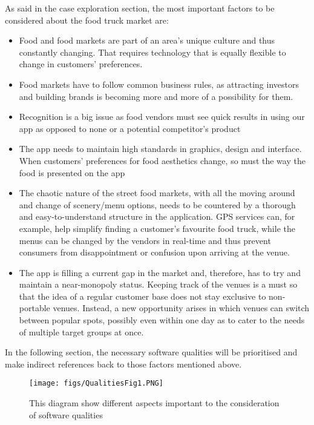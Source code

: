 As said in the case exploration section, the most important factors to be considered about the food truck market are:

\begin{itemize}

\item Food and food markets are part of an area’s unique culture and thus constantly changing. That requires technology that is equally flexible to change in customers’ preferences.

\item Food markets have to follow common business rules, as attracting investors and building brands is becoming more and more of a possibility for them.

\item Recognition is a big issue as food vendors must see quick results in using our app as opposed to none or a potential competitor’s product

\item The app needs to maintain high standards in graphics, design and interface. When customers’ preferences for food aesthetics change, so must the way the food is presented on the app

\item The chaotic nature of the street food markets, with all the moving around and change of scenery/menu options, needs to be countered by a thorough and easy-to-understand structure in the application. GPS services can, for example, help simplify finding a customer’s favourite food truck, while the menus can be changed by the vendors in real-time and thus prevent consumers from disappointment or confusion upon arriving at the venue.

\item The app is filling a current gap in the market and, therefore, has to try and maintain a near-monopoly status.
Keeping track of the venues is a must so that the idea of a regular customer base does not stay exclusive to non-portable venues. Instead, a new opportunity arises in which venues can switch between popular spots, possibly even within one day as to cater to the needs of multiple target groups at once.
\end{itemize}


In the following section, the necessary software qualities will be prioritised and make indirect references back to those factors mentioned above.

\begin{figure}[h!]
  \centering
  \texttt{[image: figs/QualitiesFig1.PNG]}
  \caption{This diagram show different aspects important to the consideration of software qualities}
  \label{QualitiesFig1}
\end{figure}


